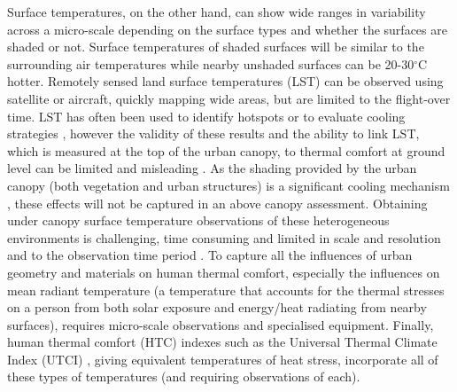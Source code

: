 \documentclass[final,3p,times,authoryear]{elsarticle}
\begin{document}
Surface temperatures, on the other hand, can show wide ranges in variability across a micro-scale depending on the surface types and whether the surfaces are shaded or not. Surface temperatures of shaded surfaces will be similar to the surrounding air temperatures while nearby unshaded surfaces can be 20-30$^{\circ}$C hotter. Remotely sensed land surface temperatures (LST) can be observed using satellite or aircraft, quickly mapping wide areas, but are limited to the flight-over time. LST has often been used to identify hotspots \citep{Aniello1995} or to evaluate cooling strategies \citep{Zhu2012a,Duncan2018,Manoli2019,Ossola2021}, however the validity of these results and the ability to link LST, which is measured at the top of the urban canopy, to thermal comfort at ground level can be limited and misleading \citep{Coutts2016d}. As the shading provided by the urban canopy (both vegetation and urban structures) is a significant cooling mechanism \citep{Coutts2015,Lee2018,Krayenhoff2021}, these effects will not be captured in an above canopy assessment. Obtaining under canopy surface temperature observations of these heterogeneous environments is challenging, time consuming and limited in scale and resolution and to the observation time period \citep{Middel2019a}. To capture all the influences of urban geometry and materials on human thermal comfort, especially the influences on mean radiant temperature \citep{Kantor2011} (a temperature that accounts for the thermal stresses on a person from both solar exposure and energy/heat radiating from nearby surfaces), requires micro-scale observations and specialised equipment. Finally, human thermal comfort (HTC) indexes such as the Universal Thermal Climate Index (UTCI) \citep{Brode2012a}, giving equivalent temperatures of heat stress, incorporate all of these types of temperatures (and requiring observations of each).



\end{document}
